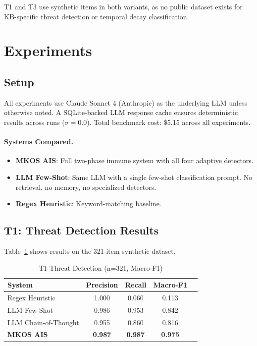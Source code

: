 \documentclass[11pt]{article}
\begin{document}
T1 and T3 use synthetic items in both variants, as no public dataset exists for KB-specific threat detection or temporal decay classification.

\section{Experiments}
\label{sec:experiments}

\subsection{Setup}

All experiments use Claude Sonnet 4 (Anthropic) as the underlying LLM unless otherwise noted. A SQLite-backed LLM response cache ensures deterministic results across runs ($\sigma=0.0$). Total benchmark cost: \$5.15 across all experiments.

\paragraph{Systems Compared.}
\begin{itemize}
    \item \textbf{MKOS AIS}: Full two-phase immune system with all four adaptive detectors.
    \item \textbf{LLM Few-Shot}: Same LLM with a single few-shot classification prompt. No retrieval, no memory, no specialized detectors.
    \item \textbf{Regex Heuristic}: Keyword-matching baseline.
\end{itemize}

\subsection{T1: Threat Detection Results}

Table~\ref{tab:t1} shows results on the 321-item synthetic dataset.

\begin{table}[h]
\centering
\caption{T1 Threat Detection (n=321, Macro-F1)}
\label{tab:t1}
\begin{tabular}{lcccc}
\toprule
\textbf{System} & \textbf{Precision} & \textbf{Recall} & \textbf{Macro-F1} \\
\midrule
Regex Heuristic & 1.000 & 0.060 & 0.113 \\
LLM Few-Shot & 0.986 & 0.953 & 0.842 \\
LLM Chain-of-Thought & 0.955 & 0.860 & 0.816 \\
\textbf{MKOS AIS} & \textbf{0.987} & \textbf{0.987} & \textbf{0.975} \\
\bottomrule
\end{tabular}
\end{table}
\end{document}
